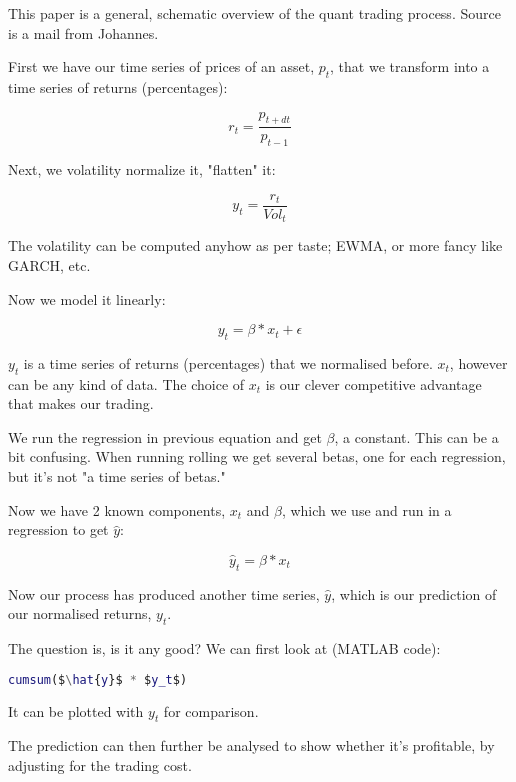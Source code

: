\documentclass[a4paper]{article}
\title{\documenttitle}
\date{\today}
\author{Frans Englich \\
        \href{mailto:fenglich@fastmail.fm}{fenglich@fastmail.fm}}
\begin{document}
\maketitle

This paper is a general, schematic overview of the quant trading process. Source is a mail from Johannes.

First we have our time series of prices of an asset, $p_t$, that we transform into a time series of returns (percentages):

\begin{equation*}
    r_t = \frac{p_{t + dt}}{p_{t - 1}}
\end{equation*}

Next, we volatility normalize it, "flatten" it:

\begin{equation*}
    y_t = \frac{r_t}{Vol_t}
\end{equation*}

The volatility can be computed anyhow as per taste; EWMA, or more fancy like GARCH, etc.

Now we model it linearly:

\begin{equation*}
    y_t = \beta*x_t + \epsilon
\end{equation*}

$y_t$ is a time series of returns (percentages) that we normalised before. $x_t$, however can be any kind of data. The choice of $x_t$ is our clever competitive advantage that makes our trading.

We run the regression in previous equation and get $\beta$, a constant. This can be a bit confusing. When running rolling we get several betas, one for each regression, but it's not "a time series of betas."

Now we have 2 known components, $x_t$ and $\beta$, which we use and run in a regression to get $\hat{y}$:

\begin{equation*}
    \hat{y}_t = \beta*x_t
\end{equation*}

Now our process has produced another time series, $\hat{y}$, which is our prediction of our normalised returns, $y_t$.

The question is, is it any good? We can first look at (MATLAB code):

\begin{lstlisting}[language=Matlab, mathescape=true]
cumsum($\hat{y}$ * $y_t$)
\end{lstlisting}

It can be plotted with $y_t$ for comparison.

The prediction can then further be analysed to show whether it's profitable, by adjusting for the trading cost.
\end{document}
